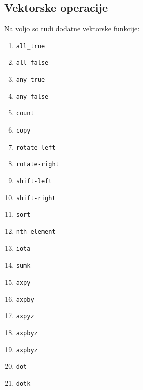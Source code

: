 \documentclass[12pt]{report}
\begin{document}
		\subsection{Vektorske operacije}
			Na voljo so tudi dodatne vektorske funkcije:
			\begin{multicols}{3}
			\begin{enumerate}
				\item \texttt{all\_true}
				\item \texttt{all\_false}
				\item \texttt{any\_true}
				\item \texttt{any\_false}
				\item \texttt{count}
				\item \texttt{copy}
				\item \texttt{rotate-left}
				\item \texttt{rotate-right}
				\item \texttt{shift-left}
				\item \texttt{shift-right}
				\item \texttt{sort}
				\item \texttt{nth\_element}
				\item \texttt{iota}
				\item \texttt{sumk}
				\item \texttt{axpy}
				\item \texttt{axpby}
				\item \texttt{axpyz}
				\item \texttt{axpbyz}
				\item \texttt{axpbyz}
				\item \texttt{dot}
				\item \texttt{dotk}
			\end{enumerate}
			\end{multicols}
			
\end{document}

